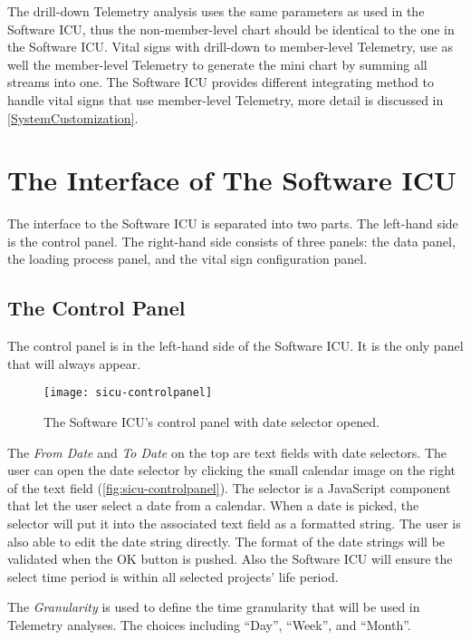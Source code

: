 The drill-down Telemetry analysis uses the same parameters as used in the Software ICU, thus the non-member-level chart should be identical to the one in the Software ICU. Vital signs with drill-down to member-level Telemetry, use as well the member-level Telemetry to generate the mini chart by summing all streams into one. The Software ICU provides different integrating method to handle vital signs that use member-level Telemetry, more detail is discussed in \autoref{SystemCustomization}.


\section{The Interface of The Software ICU}

The interface to the Software ICU is separated into two parts. The left-hand side is the control panel. The right-hand side consists of three panels: the data panel, the loading process panel, and the vital sign configuration panel. 

\subsection{The Control Panel}

The control panel is in the left-hand side of the Software ICU. It is the only panel that will always appear.

\begin{figure}[htbp]
   \centering
   \texttt{[image: sicu-controlpanel]}
   \caption{The Software ICU's control panel with date selector opened.}
   \label{fig:sicu-controlpanel}
\end{figure}

The {\it From Date} and {\it To Date} on the top are text fields with date selectors. The user can open the date selector by clicking the small calendar image on the right of the text field (\autoref{fig:sicu-controlpanel}). The selector is a JavaScript component that let the user select a date from a calendar. When a date is picked, the selector will put it into the associated text field as a formatted string. The user is also able to edit the date string directly. The format of the date strings will be validated when the OK button is pushed. Also the Software ICU will ensure the select time period is within all selected projects' life period.

The {\it Granularity} is used to define the time granularity that will be used in Telemetry analyses. The choices including ``Day'', ``Week'', and ``Month''.

